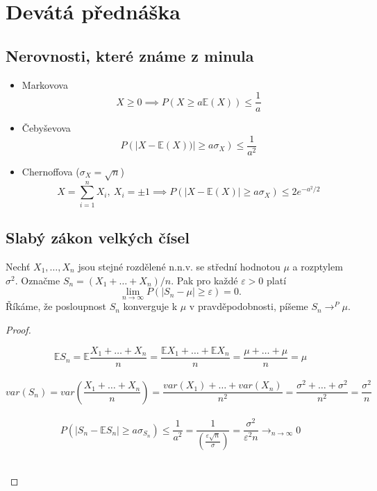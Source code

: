 \documentclass[../main.tex]{subfiles}
\begin{document}
\section{Devátá přednáška}

\subsection{Nerovnosti, které známe z minula}
\begin{itemize}
    \item Markovova
    \[X\geq 0 \implies P(X\geq a\mathbb{E}(X))\leq \frac{1}{a}\]
    \item Čebyševova
    \[P(|X-\mathbb{E}(X))|\geq a\sigma_X)\leq \frac{1}{a^2}\]
    \item Chernoffova ($\sigma_X = \sqrt{n}$)
    \[X = \sum^n_{i=1}X_i,\ X_i = \pm 1 \implies P(|X-\mathbb{E}(X)| \geq a\sigma_X)\leq 2e^{-a^2/2}\]
\end{itemize}

\subsection{Slabý zákon velkých čísel}
\begin{theorem}
    Nechť $X_1,\dots ,X_n$ jsou stejné rozdělené n.n.v. se střední hodnotou $\mu$ a rozptylem $\sigma^2$.
    Označme $S_n = (X_1 + \dots + X_n)/n$.
    Pak pro každé $\varepsilon > 0$ platí
    \[\lim_{n\rightarrow \infty} P(|S_n - \mu | \geq \varepsilon) = 0.\]
    Říkáme, že posloupnost $S_n$ konverguje k $\mu$ v pravděpodobnosti, píšeme $S_n \rightarrow^P \mu$.
\end{theorem}
\begin{proof}
    \begin{center}
        \[\mathbb{E}S_n = \mathbb{E}\frac{X_1 + \dots + X_n}{n} = \frac{\mathbb{E}X_1 + \dots + \mathbb{E}X_n}{n}
         = \frac{\mu + \dots + \mu}{n} = \mu\]\\
        \[var(S_n) = var \left(\frac{X_1 + \dots + X_n}{n}\right) = \frac{var(X_1) + \dots + var(X_n)}{n^2} 
        = \frac{\sigma^2 + \dots + \sigma^2}{n^2} = \frac{\sigma^2}{n}\]\\
        \[P(|S_n - \mathbb{E}S_n | \geq a\sigma_{S_n}) \leq \frac{1}{a^2} = \frac{1}{\left(\frac{\varepsilon \sqrt{n}}{\sigma}\right)} =
        \frac{\sigma^2}{\varepsilon^2 n} \rightarrow_{n\rightarrow \infty} 0\]\\
    \end{center}
\end{proof}
\end{document}
